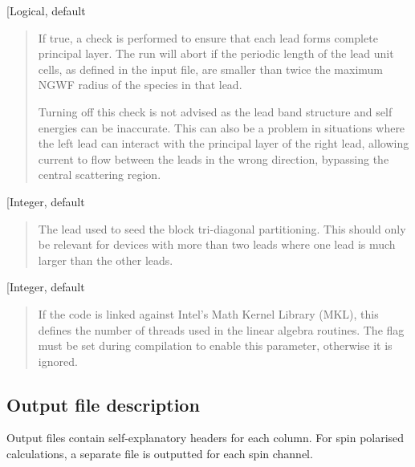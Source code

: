 \documentclass[letterpaper,10pt,english]{sphinxmanual}
\begin{document}
 {[}Logical, default \sphinxcode{etrans\_lead\_size\_check: T}{]}
\begin{quote}

\begin{DUlineblock}{0em}
\item[] If true, a check is performed to ensure that each lead forms complete
principal layer. The run will abort if the periodic length of the lead
unit cells, as defined in the input file, are smaller than twice the
maximum NGWF radius of the species in that lead.
\item[] Turning off this check is not advised as the lead band structure and
self energies can be inaccurate. This can also be a problem in
situations where the left
lead can interact with the principal layer of the right lead, allowing
current to flow between the leads in the wrong direction, bypassing
the central scattering region.
\end{DUlineblock}
\end{quote}

 {[}Integer, default \sphinxcode{etrans\_seed\_lead: 1}{]}
\begin{quote}

\begin{DUlineblock}{0em}
\item[] The lead used to seed the block tri-diagonal partitioning. This should
only be relevant for devices with more than two leads where one lead
is much larger than the other leads.
\end{DUlineblock}
\end{quote}

 {[}Integer, default \sphinxcode{threads\_num\_mkl: 1}{]}
\begin{quote}

\begin{DUlineblock}{0em}
\item[] If the code is linked against Intel’s Math Kernel Library (MKL), this
defines the number of threads used in the linear algebra routines. The
flag  must be set during compilation to enable this parameter,
otherwise it is ignored.
\end{DUlineblock}
\end{quote}


\subsection{Output file description}
\label{\detokenize{transport:output-file-description}}
Output files contain self-explanatory headers for each column. For spin
polarised calculations, a separate file is outputted for each spin
channel.
\end{document}
